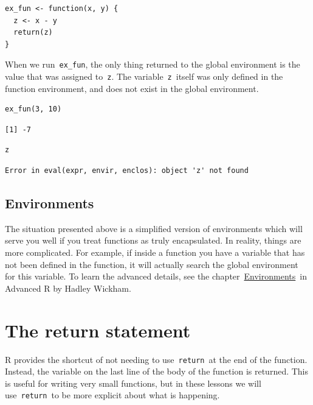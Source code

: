\documentclass[
]{book}
\begin{document}
\begin{verbatim}
ex_fun <- function(x, y) {
  z <- x - y
  return(z)
}
\end{verbatim}

When we run~\texttt{ex\_fun}, the only thing returned to the global environment is the value that was assigned to~\texttt{z}. The variable~\texttt{z}~itself was only defined in the function environment, and does not exist in the global environment.

\begin{verbatim}
ex_fun(3, 10)
\end{verbatim}

\begin{verbatim}
[1] -7
\end{verbatim}

\begin{verbatim}
z
\end{verbatim}

\begin{verbatim}
Error in eval(expr, envir, enclos): object 'z' not found
\end{verbatim}

\hypertarget{environments}{%
\subsection{Environments}\label{environments}}

The situation presented above is a simplified version of environments which will serve you well if you treat functions as truly encapsulated. In reality, things are more complicated. For example, if inside a function you have a variable that has not been defined in the function, it will actually search the global environment for this variable. To learn the advanced details, see the chapter~\href{http://adv-r.had.co.nz/Environments.html}{Environments}~in Advanced R by Hadley Wickham.

\hypertarget{the-return-statement}{%
\section{The return statement}\label{the-return-statement}}

R provides the shortcut of not needing to use~\texttt{return}~at the end of the function. Instead, the variable on the last line of the body of the function is returned. This is useful for writing very small functions, but in these lessons we will use~\texttt{return}~to be more explicit about what is happening.
\end{document}
